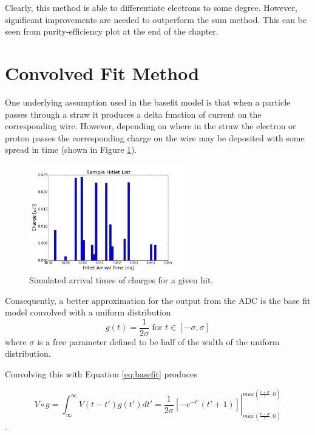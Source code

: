 Clearly, this method is able to differentiate electrons to some degree. However, significant improvements are needed to outperform the sum method. This can be seen from purity-efficiency plot at the end of the chapter.

\section{Convolved Fit Method}
One underlying assumption used in the basefit model is that when a particle passes through a straw it produces a delta function of current on the corresponding wire. However, depending on where in the straw the electron or proton passes the corresponding charge on the wire may be deposited with some spread in time (shown in Figure \ref{fig:hitletTimes}).

\begin{figure}[htp!]
    \centering
    \includegraphics[width=0.6\textwidth]{Images2/hitletlist.png}
    \caption{Simulated arrival times of charges for a given hit.}
    \label{fig:hitletTimes}
\end{figure} 


Consequently, a better approximation for the output from the ADC is the base fit model convolved with a uniform distribution
\begin{equation}
    g(t) = \frac{1}{2 \sigma} \text{ for } t \in \left[ -\sigma, \sigma \right]
\end{equation}
where $\sigma$ is a free parameter defined to be half of the width of the uniform distribution.


Convolving this with Equation \ref{eq:basefit} produces 

\begin{equation}
   V \circ g =  \int_{\infty}^{\infty} V(t - t') g(t') dt' = \left. \frac{1}{2 \sigma}\left[ -e^{-t'} (t' + 1) \right] \right|_{max(\frac{t - \sigma}{\tau},0)}^{max(\frac{t + \sigma}{\tau},0)}
 \end{equation}.

